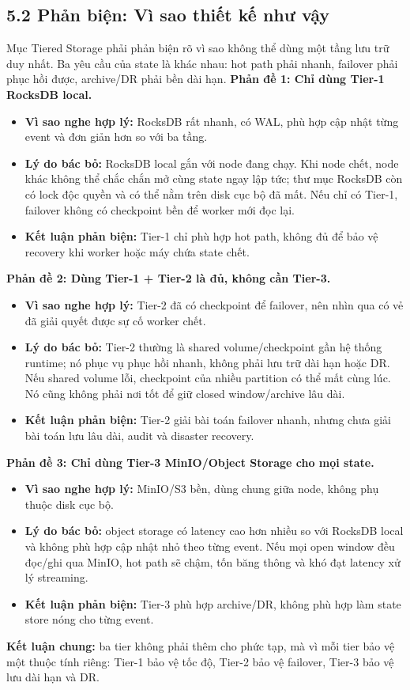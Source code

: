 \documentclass[12pt,a4paper]{article}
\begin{document}
\subsection{5.2 Phản biện: Vì sao thiết kế như vậy}
Mục Tiered Storage phải phản biện rõ vì sao không thể dùng một tầng lưu trữ duy nhất. Ba yêu cầu của state là khác nhau: hot path phải nhanh, failover phải phục hồi được, archive/DR phải bền dài hạn.
\textbf{Phản đề 1: Chỉ dùng Tier-1 RocksDB local.}

\begin{itemize}
\item \textbf{Vì sao nghe hợp lý:} RocksDB rất nhanh, có WAL, phù hợp cập nhật từng event và đơn giản hơn so với ba tầng.
\item \textbf{Lý do bác bỏ:} RocksDB local gắn với node đang chạy. Khi node chết, node khác không thể chắc chắn mở cùng state ngay lập tức; thư mục RocksDB còn có lock độc quyền và có thể nằm trên disk cục bộ đã mất. Nếu chỉ có Tier-1, failover không có checkpoint bền để worker mới đọc lại.
\item \textbf{Kết luận phản biện:} Tier-1 chỉ phù hợp hot path, không đủ để bảo vệ recovery khi worker hoặc máy chứa state chết.
\end{itemize}
\textbf{Phản đề 2: Dùng Tier-1 + Tier-2 là đủ, không cần Tier-3.}

\begin{itemize}
\item \textbf{Vì sao nghe hợp lý:} Tier-2 đã có checkpoint để failover, nên nhìn qua có vẻ đã giải quyết được sự cố worker chết.
\item \textbf{Lý do bác bỏ:} Tier-2 thường là shared volume/checkpoint gần hệ thống runtime; nó phục vụ phục hồi nhanh, không phải lưu trữ dài hạn hoặc DR. Nếu shared volume lỗi, checkpoint của nhiều partition có thể mất cùng lúc. Nó cũng không phải nơi tốt để giữ closed window/archive lâu dài.
\item \textbf{Kết luận phản biện:} Tier-2 giải bài toán failover nhanh, nhưng chưa giải bài toán lưu lâu dài, audit và disaster recovery.
\end{itemize}
\textbf{Phản đề 3: Chỉ dùng Tier-3 MinIO/Object Storage cho mọi state.}

\begin{itemize}
\item \textbf{Vì sao nghe hợp lý:} MinIO/S3 bền, dùng chung giữa node, không phụ thuộc disk cục bộ.
\item \textbf{Lý do bác bỏ:} object storage có latency cao hơn nhiều so với RocksDB local và không phù hợp cập nhật nhỏ theo từng event. Nếu mọi open window đều đọc/ghi qua MinIO, hot path sẽ chậm, tốn băng thông và khó đạt latency xử lý streaming.
\item \textbf{Kết luận phản biện:} Tier-3 phù hợp archive/DR, không phù hợp làm state store nóng cho từng event.
\end{itemize}
\textbf{Kết luận chung:} ba tier không phải thêm cho phức tạp, mà vì mỗi tier bảo vệ một thuộc tính riêng: Tier-1 bảo vệ tốc độ, Tier-2 bảo vệ failover, Tier-3 bảo vệ lưu dài hạn và DR.
\end{document}
